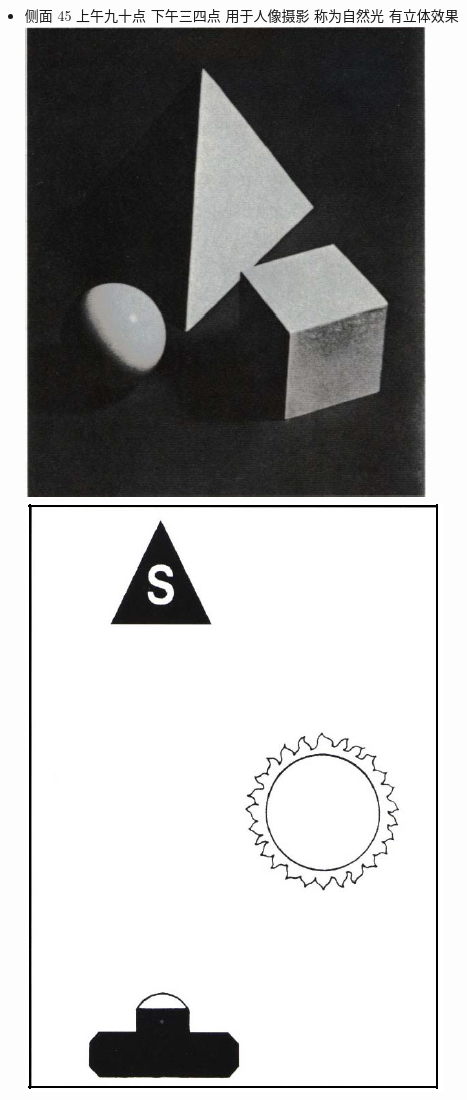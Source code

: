 \documentclass[
  letterpaper,
  DIV=11,
  numbers=noendperiod]{scrreprt}
\begin{document}
\begin{itemize}
\item
  侧面 45 上午九十点 下午三四点 用于人像摄影 称为自然光 有立体效果
  \includegraphics{images/side.png} \includegraphics{images/posside.png}

\end{itemize}
\end{document}
